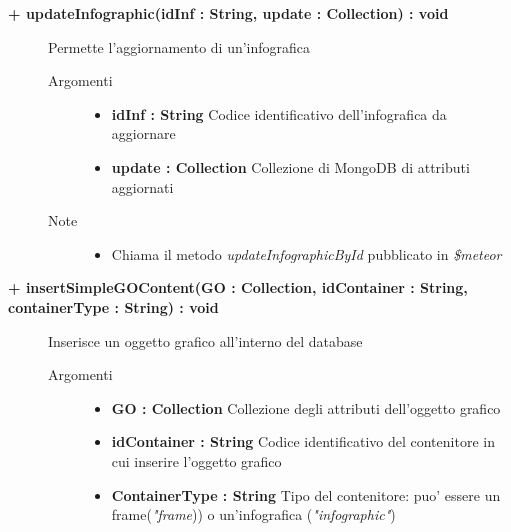 \begin{description}
	\begin{description}
		\item[\textbf{\color{blue}+ updateInfographic(idInf : String, update : Collection) : void			}] \hfill
			Permette l'aggiornamento di un'infografica
			
		\begin{description}
			\item[Argomenti] \hfill
				\begin{itemize}
					\item \textbf{idInf : String			} \hfill
					Codice identificativo dell'infografica da aggiornare
					\item \textbf{update : Collection			} \hfill
					Collezione di MongoDB di attributi aggiornati
					
				\end{itemize}
			\item[Note] \hfill
			\begin{itemize}
					\item Chiama il metodo \textit{updateInfographicById} pubblicato in \textit{\$meteor}
			\end{itemize}
		\end{description}
	\end{description}
	
	\begin{description}
		\item[\textbf{\color{blue}+ insertSimpleGOContent(GO : Collection, idContainer : String, containerType : String) : void			}] \hfill
			Inserisce un oggetto grafico all'interno del database
			
		\begin{description}
			\item[Argomenti] \hfill
				\begin{itemize}
					\item \textbf{GO : Collection			} \hfill
					Collezione degli attributi dell'oggetto grafico
					\item \textbf{idContainer : String			} \hfill
					Codice identificativo del contenitore in cui inserire l'oggetto grafico
					\item \textbf{ContainerType : String			} \hfill
					Tipo del contenitore: puo' essere un frame(\textit{"frame})) o un'infografica (\textit{"infographic"})
					

\end{itemize}
\end{description}
\end{description}
\end{description}
